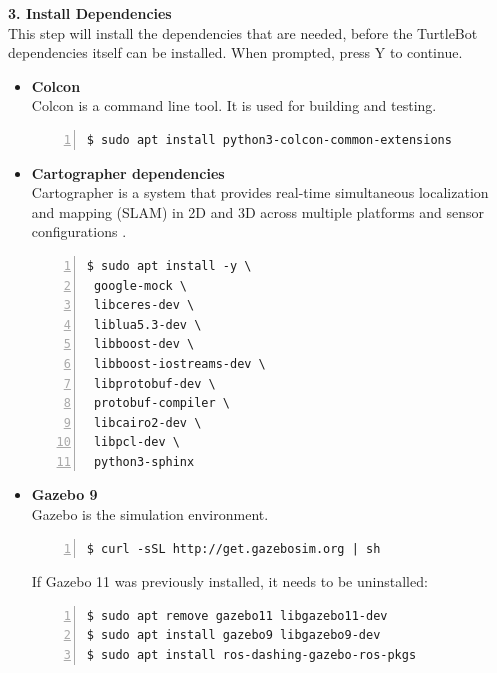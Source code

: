 \documentclass[plainarticle,zihtitle,english,final,hyperref,utf8]{zihpub}
\begin{document}
\newpage
\textbf{3. Install Dependencies}\\
\newline
This step will install the dependencies that are needed, before the TurtleBot dependencies itself can be installed.
When prompted, press Y to continue.
\begin{itemize}
    \item \textbf{Colcon} \\
        Colcon is a command line tool. It is used for building and testing.
        \begin{Verbatim}[breaklines=true, breakanywhere=true, baselinestretch=1,fontsize=\scriptsize,numbers=left,frame=single,stepnumber=5,xleftmargin=1cm,xrightmargin=1cm]
$ sudo apt install python3-colcon-common-extensions
        \end{Verbatim}

    \item \textbf{Cartographer dependencies} \\
    Cartographer is a system that provides real-time simultaneous localization and mapping (SLAM) in 2D and 3D across multiple platforms and sensor configurations \cite{cartographer}.
    \begin{Verbatim}[breaklines=true, breakanywhere=true, baselinestretch=1,fontsize=\scriptsize,numbers=left,frame=single,stepnumber=5,xleftmargin=1cm,xrightmargin=1cm]
$ sudo apt install -y \
 google-mock \
 libceres-dev \
 liblua5.3-dev \
 libboost-dev \
 libboost-iostreams-dev \
 libprotobuf-dev \
 protobuf-compiler \
 libcairo2-dev \
 libpcl-dev \
 python3-sphinx
    \end{Verbatim}

    \item \textbf{Gazebo 9} \\
    Gazebo is the simulation environment.
    \begin{Verbatim}[breaklines=true, breakanywhere=true, baselinestretch=1,fontsize=\scriptsize,numbers=left,frame=single,stepnumber=5,xleftmargin=1cm,xrightmargin=1cm]
$ curl -sSL http://get.gazebosim.org | sh
    \end{Verbatim}
    If Gazebo 11 was previously installed, it needs to be uninstalled:
    \begin{Verbatim}[breaklines=true, breakanywhere=true, baselinestretch=1,fontsize=\scriptsize,numbers=left,frame=single,stepnumber=5,xleftmargin=1cm,xrightmargin=1cm]
$ sudo apt remove gazebo11 libgazebo11-dev
$ sudo apt install gazebo9 libgazebo9-dev
$ sudo apt install ros-dashing-gazebo-ros-pkgs
    \end{Verbatim}
    

\end{itemize}
\end{document}
